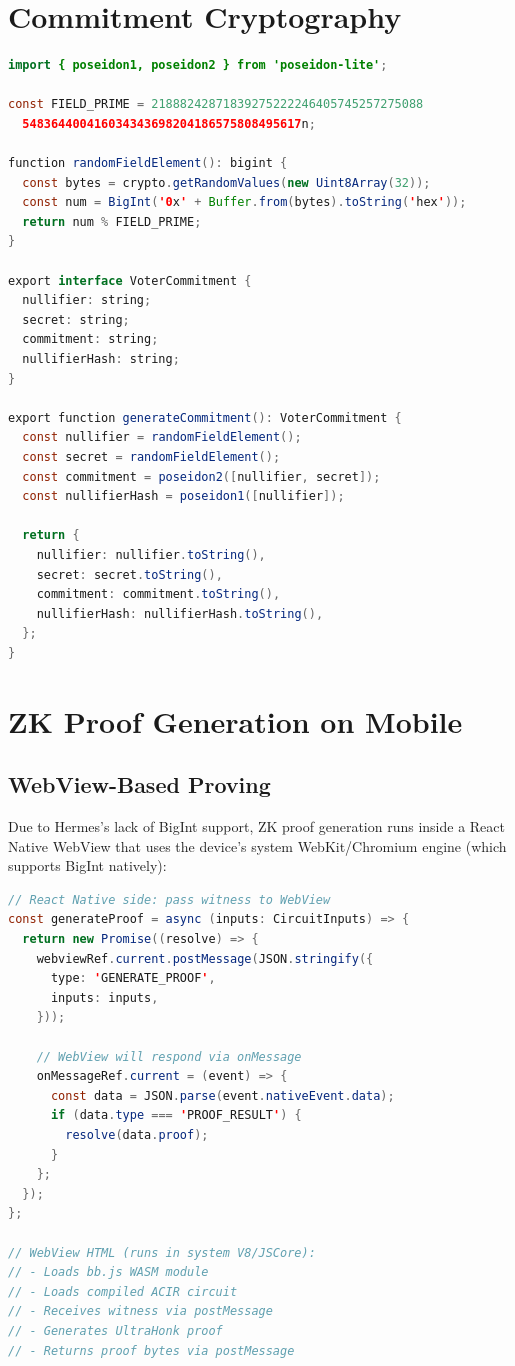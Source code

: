 \section{Commitment Cryptography}

\begin{lstlisting}[language=Java, caption={Voter commitment generation using Poseidon.}]
import { poseidon1, poseidon2 } from 'poseidon-lite';

const FIELD_PRIME = 21888242871839275222246405745257275088
  548364400416034343698204186575808495617n;

function randomFieldElement(): bigint {
  const bytes = crypto.getRandomValues(new Uint8Array(32));
  const num = BigInt('0x' + Buffer.from(bytes).toString('hex'));
  return num % FIELD_PRIME;
}

export interface VoterCommitment {
  nullifier: string;
  secret: string;
  commitment: string;
  nullifierHash: string;
}

export function generateCommitment(): VoterCommitment {
  const nullifier = randomFieldElement();
  const secret = randomFieldElement();
  const commitment = poseidon2([nullifier, secret]);
  const nullifierHash = poseidon1([nullifier]);
  
  return {
    nullifier: nullifier.toString(),
    secret: secret.toString(),
    commitment: commitment.toString(),
    nullifierHash: nullifierHash.toString(),
  };
}
\end{lstlisting}

\section{ZK Proof Generation on Mobile}

\subsection{WebView-Based Proving}

Due to Hermes's lack of BigInt support, ZK proof generation runs inside a React Native WebView that uses the device's system WebKit/Chromium engine (which supports BigInt natively):

\begin{lstlisting}[language=Java, caption={WebView proof generation architecture.}]
// React Native side: pass witness to WebView
const generateProof = async (inputs: CircuitInputs) => {
  return new Promise((resolve) => {
    webviewRef.current.postMessage(JSON.stringify({
      type: 'GENERATE_PROOF',
      inputs: inputs,
    }));
    
    // WebView will respond via onMessage
    onMessageRef.current = (event) => {
      const data = JSON.parse(event.nativeEvent.data);
      if (data.type === 'PROOF_RESULT') {
        resolve(data.proof);
      }
    };
  });
};

// WebView HTML (runs in system V8/JSCore):
// - Loads bb.js WASM module
// - Loads compiled ACIR circuit
// - Receives witness via postMessage
// - Generates UltraHonk proof
// - Returns proof bytes via postMessage
\end{lstlisting}

